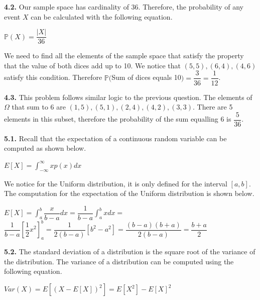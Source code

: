 \documentclass[12pt]{article}
\begin{document}
{\bf 4.2.} Our sample space has cardinality of 36. Therefore, the probability of any event $X$ can be calculated with the following equation.

\begin{center}

$\mathbb{P}(X)=\dfrac{|X|}{36}$\\

\end{center}

We need to find all the elements of the sample space that satisfy the property that the value of both dices add up to 10. We notice that $(5,5),(6,4),(4,6)$ satisfy this condition. Therefore $\mathbb{P}($Sum of dices equals 10$)=\dfrac{3}{36}=\dfrac{1}{12}$. 

{\bf 4.3.} This problem follows similar logic to the previous question. The elements of $\Omega$ that sum to 6 are $(1,5),(5,1),(2,4),(4,2),(3,3)$. There are 5 elements in this subset, therefore the probability of the sum equalling 6 is $\dfrac{5}{36}$. 

{\bf 5.1.} Recall that the expectation of a continuous random variable can be computed as shown below.

\begin{center}

$E[X]=\displaystyle \int_{-\infty}^{\infty}xp(x)dx$\\

\end{center}

We notice for the Uniform distribution, it is only defined for the interval $[a,b]$. The computation for the expectation of the Uniform distribution is shown below.

\begin{center}

$E[X]=\displaystyle \int_{a}^{b}\dfrac{x}{b-a}dx=\dfrac{1}{b-a}\displaystyle \int_{a}^{b}xdx=$\\
\bigskip
$\dfrac{1}{b-a}[\dfrac{1}{2}x^{2}]_{a}^{b}=\dfrac{1}{2(b-a)}[b^{2}-a^{2}]=\dfrac{(b-a)(b+a)}{2(b-a)}=\dfrac{b+a}{2}$\\

\end{center}

{\bf 5.2.} The standard deviation of a distribution is the square root of the variance of the distribution. The variance of a distribution can be computed using the following equation.

\begin{center}

$Var(X)=E[(X-E[X])^{2}]=E[X^{2}]-E[X]^{2}$\\

\end{center}
\end{document}
